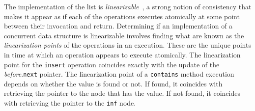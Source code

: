 \documentclass{report}
\begin{document}
%
The implementation of the list is
\emph{linearizable}~\cite{HW90},
%
a strong notion of consistency that
makes it appear as if each of the operations executes atomically at
some point between their invocation and return.
Determining if an implementation of a concurrent data structure
is linearizable involves finding what are known as the
\emph{linearization points}
%
of the operations in an execution.  These are the unique
points in time at which an operation appears to execute atomically.
The linearization point for the \texttt{insert} operation coincides exactly with the update
of the \textit{before}.\texttt{next} pointer.
The linearization point of a \texttt{contains} method
execution depends on whether the value is found or not.
If found, it coincides with retrieving the pointer to the node
that has the value.
If not found, it coincides with retrieving the pointer to the
\texttt{inf} node.
\end{document}
